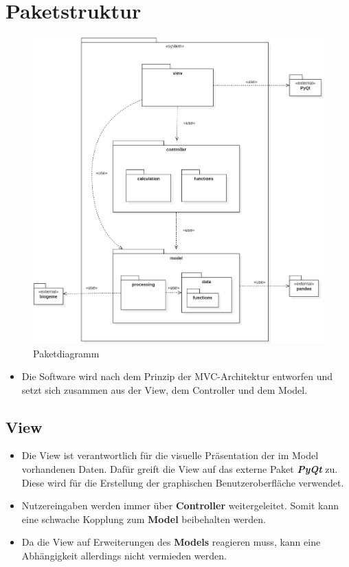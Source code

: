 \documentclass{article}
\begin{document}
\section{Paketstruktur}
\begin{figure}[H]%
    \centering
    \includegraphics[width=13cm]{img/PackageDiagram.png}
    \caption{Paketdiagramm}
\end{figure}

\begin{itemize}
\item Die Software wird nach dem Prinzip der MVC-Architektur entworfen und setzt sich zusammen aus der View, dem Controller und dem Model.
\end{itemize}

\subsection{View}
\begin{itemize}
\item Die View ist verantwortlich für die visuelle Präsentation der im Model vorhandenen Daten. Dafür greift die View auf das externe Paket \textit{\textbf{PyQt}} zu. Diese wird für die Erstellung der graphischen Benutzeroberfläche verwendet.
\item Nutzereingaben werden immer über \textbf{Controller} weitergeleitet. Somit kann eine schwache Kopplung zum \textbf{Model} beibehalten werden.
\item Da die View auf Erweiterungen des \textbf{Models} reagieren muss, kann eine Abhängigkeit allerdings nicht vermieden werden.
\end{itemize}
\end{document}
